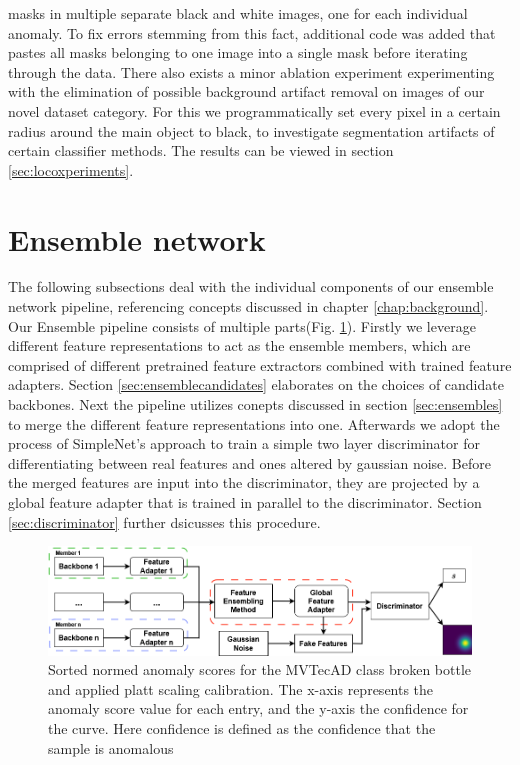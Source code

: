 masks in multiple separate black and white images, one for each individual anomaly. To fix errors stemming from this fact, additional 
code was added that pastes all masks belonging to one image into a single mask before iterating through the data. 
There also exists a minor ablation experiment experimenting with the elimination 
of possible background artifact removal on images of our novel dataset category. For this we programmatically set every pixel in a certain radius around the main object to black, to investigate 
segmentation artifacts of certain classifier methods. The results can be viewed in section \ref{sec:locoxperiments}.




\section{Ensemble network}
\label{sec:ourensemblenetwork}


The following subsections deal with the individual components of our ensemble network pipeline, referencing concepts discussed in chapter \ref{chap:background}. Our Ensemble pipeline 
consists of multiple parts(Fig. \ref{fig:ensemblepipeline}). Firstly we leverage different feature representations to act as the ensemble members, which are comprised of 
different pretrained feature extractors combined with trained feature adapters. Section \ref{sec:ensemblecandidates} elaborates on the choices of candidate backbones. Next the pipeline 
utilizes conepts discussed in section \ref{sec:ensembles} to merge the different feature representations into one. Afterwards we adopt the process of SimpleNet's \cite{liu2023simplenet} 
approach to train a simple two layer discriminator for differentiating between real features and ones altered by gaussian noise. Before the merged features are input into the 
discriminator, they are projected by a global feature adapter that is trained in parallel to the discriminator. Section \ref{sec:discriminator} further dsicusses this procedure.

\begin{figure}[htbp]
    \centering
    \includegraphics[width=\textwidth]{figures/ensemblepipeline.png}
    \caption{Sorted normed anomaly scores for the MVTecAD \cite{MVTEC_Bergmann_2021} class broken bottle and applied platt scaling calibration. The x-axis represents 
            the anomaly score value for each entry, and the y-axis the confidence for the curve. Here confidence is defined as the confidence that the sample is anomalous}
    \label{fig:ensemblepipeline}
\end{figure}


